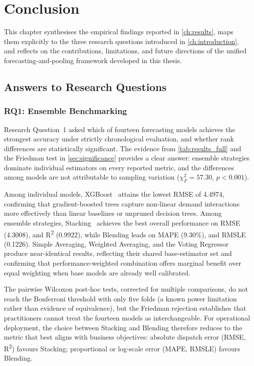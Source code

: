 \chapter{Conclusion}
\label{ch:conclusion}

This chapter synthesises the empirical findings reported in \autoref{ch:results}, maps them explicitly to the three research questions introduced in \autoref{ch:introduction}, and reflects on the contributions, limitations, and future directions of the unified forecasting-and-pooling framework developed in this thesis.

\section{Answers to Research Questions}

\subsection{RQ1: Ensemble Benchmarking}

Research Question~1 asked which of fourteen forecasting models achieves the strongest accuracy under strictly chronological evaluation, and whether rank differences are statistically significant. The evidence from \autoref{tab:results_full} and the Friedman test in \autoref{sec:significance} provides a clear answer: ensemble strategies dominate individual estimators on every reported metric, and the differences among models are not attributable to sampling variation ($\chi^2_F = 57.30$, $p < 0.001$).

Among individual models, XGBoost~\parencite{chen2016xgboost} attains the lowest RMSE of 4.4974, confirming that gradient-boosted trees capture non-linear demand interactions more effectively than linear baselines or unpruned decision trees. Among ensemble strategies, Stacking~\parencite{wolpert1992stacking} achieves the best overall performance on RMSE (4.3008), and R\textsuperscript{2} (0.9922), while Blending leads on MAPE (9.30\%), and RMSLE (0.1226). Simple Averaging, Weighted Averaging, and the Voting Regressor produce near-identical results, reflecting their shared base-estimator set and confirming that performance-weighted combination offers marginal benefit over equal weighting when base models are already well calibrated.

The pairwise Wilcoxon post-hoc tests, corrected for multiple comparisons, do not reach the Bonferroni threshold with only five folds (a known power limitation rather than evidence of equivalence), but the Friedman rejection establishes that practitioners cannot treat the fourteen models as interchangeable. For operational deployment, the choice between Stacking and Blending therefore reduces to the metric that best aligns with business objectives: absolute dispatch error (RMSE, R\textsuperscript{2}) favours Stacking; proportional or log-scale error (MAPE, RMSLE) favours Blending.

